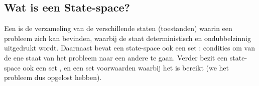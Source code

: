\subsection{Wat is een State-space?}
Een  is de verzameling van de verschillende staten (toestanden) waarin een probleem zich kan bevinden, waarbij de staat deterministisch en ondubbelzinnig uitgedrukt wordt. Daarnaast bevat een state-space ook een set : condities om van de ene staat van het probleem naar een andere te gaan. Verder bezit een state-space ook een set , en een set voorwaarden waarbij het  is bereikt (we het probleem dus opgelost hebben).
\paragraph{}

